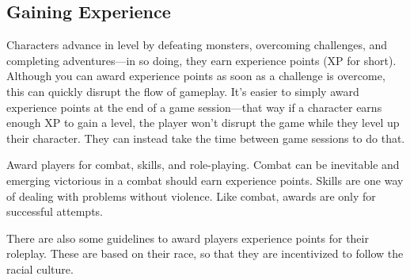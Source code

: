 \subsection{Gaining Experience}
Characters advance in level by defeating monsters, overcoming challenges, and completing adventures---in so doing, they earn experience points (XP for short). Although you can award experience points as soon as a challenge is overcome, this can quickly disrupt the flow of gameplay. It's easier to simply award experience points at the end of a game session---that way if a character earns enough XP to gain a level, the player won't disrupt the game while they level up their character. They can instead take the time between game sessions to do that.


Award players for combat, skills, and role-playing. Combat can be inevitable and emerging victorious in a combat should earn experience points. Skills are one way of dealing with problems without violence. Like combat, awards are only for successful attempts.

There are also some guidelines to award players experience points for their roleplay. These are based on their race, so that they are incentivized to follow the racial culture.
